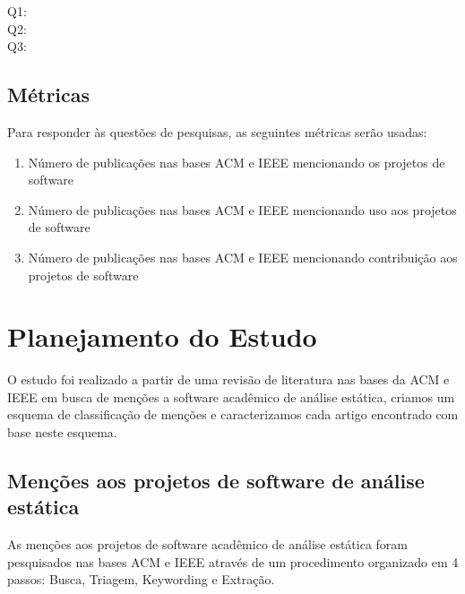 \begin{description}
  \item [Q1:] \EstudoDoisQuestaoUm
  \item [Q2:] \EstudoDoisQuestaoDois
  \item [Q3:] \EstudoDoisQuestaoTres
\end{description}

\subsection{Métricas}

Para responder às questões de pesquisas, as seguintes métricas serão usadas:

\begin{enumerate}
  \item Número de publicações nas bases ACM e IEEE mencionando os projetos de software
  \item Número de publicações nas bases ACM e IEEE mencionando uso aos projetos de software
  \item Número de publicações nas bases ACM e IEEE mencionando contribuição aos projetos de software
\end{enumerate}


\section{Planejamento do Estudo} \label{estudo2:planejamento} %

O estudo foi realizado a partir de uma revisão de literatura nas bases da ACM e
IEEE em busca de menções a software acadêmico de análise estática, criamos um
esquema de classificação de menções e caracterizamos cada artigo encontrado com
base neste esquema.

\subsection{Menções aos projetos de software de análise estática}

As menções aos projetos de software acadêmico de análise estática foram pesquisados nas
bases ACM e IEEE através de um procedimento organizado em 4 passos: Busca,
Triagem, Keywording e Extração.

